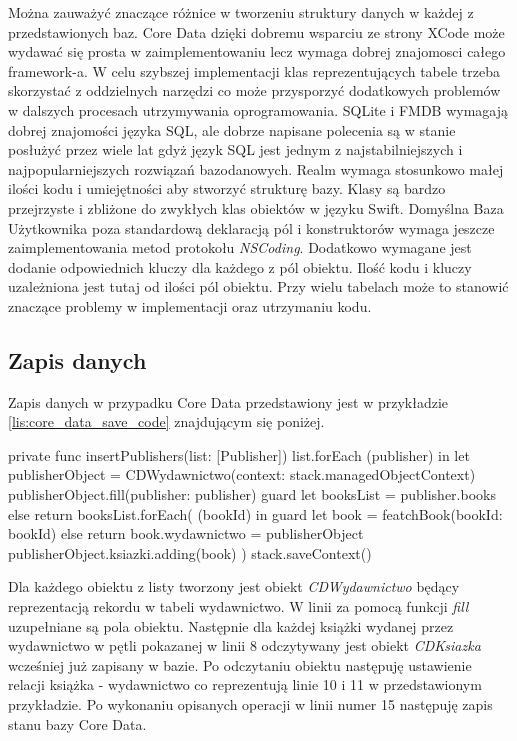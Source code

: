 Można zauważyć znaczące różnice w tworzeniu struktury danych w każdej z przedstawionych baz. Core Data dzięki dobremu wsparciu ze strony XCode może wydawać się prosta w zaimplementowaniu lecz wymaga dobrej znajomosci całego framework-a. W celu szybszej implementacji klas reprezentujących tabele trzeba skorzystać z oddzielnych narzędzi co może przysporzyć dodatkowych problemów w dalszych procesach utrzymywania oprogramowania. SQLite i FMDB wymagają dobrej znajomości języka SQL, ale dobrze napisane polecenia są w stanie posłużyć przez wiele lat gdyż język SQL jest jednym z najstabilniejszych i najpopularniejszych rozwiązań bazodanowych. Realm wymaga stosunkowo małej ilości kodu i umiejętności aby stworzyć strukturę bazy. Klasy są bardzo przejrzyste i zbliżone do zwykłych klas obiektów w języku Swift. Domyślna Baza Użytkownika poza standardową deklaracją pól i konstruktorów wymaga jeszcze zaimplementowania metod protokołu \textit{NSCoding}. Dodatkowo wymagane jest dodanie odpowiednich kluczy dla każdego z pól obiektu. Ilość kodu i kluczy uzależniona jest tutaj od ilości pól obiektu. Przy wielu tabelach może to stanowić znaczące problemy w implementacji oraz utrzymaniu kodu. 

\subsection{Zapis danych}

Zapis danych w przypadku Core Data przedstawiony jest w przykładzie \ref{lis:core_data_save_code} znajdującym się poniżej.

\begin{code}[
		language=swift,
		caption={Przykład zapisu obiektu Core Data},
		label={lis:core_data_save_code},
	]
    private func insertPublishers(list: [Publisher]) {
        list.forEach { (publisher) in
            let publisherObject = CDWydawnictwo(context: stack.managedObjectContext)
            publisherObject.fill(publisher: publisher)
            guard let booksList = publisher.books else { return }
            booksList.forEach({ (bookId) in
                guard let book = featchBook(bookId: bookId) else { return }
                book.wydawnictwo = publisherObject
                publisherObject.ksiazki.adding(book)
            })
        }
        stack.saveContext()
    }
\end{code}

Dla każdego obiektu z listy tworzony jest obiekt \textit{CDWydawnictwo} będący reprezentacją rekordu w tabeli wydawnictwo. W linii za pomocą funkcji \textit{fill} uzupełniane są pola obiektu. Następnie dla każdej książki wydanej przez wydawnictwo w pętli pokazanej w linii 8 odczytywany jest obiekt \textit{CDKsiazka} wcześniej już zapisany w bazie. Po odczytaniu obiektu następuję ustawienie relacji książka - wydawnictwo co reprezentują linie 10 i 11 w przedstawionym przykładzie. Po wykonaniu opisanych operacji w linii numer 15 następuję zapis stanu bazy Core Data. 

